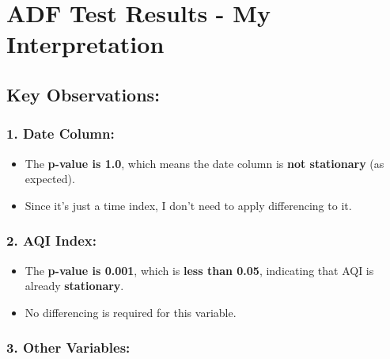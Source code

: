 \documentclass[11pt]{article}
\providecommand{\tightlist}{%
      \setlength{\itemsep}{0pt}\setlength{\parskip}{0pt}}
\begin{document}
    \hypertarget{adf-test-results---my-interpretation}{%
\section{\texorpdfstring{\textbf{ADF Test Results - My
Interpretation}}{ADF Test Results - My Interpretation}}\label{adf-test-results---my-interpretation}}

\hypertarget{key-observations}{%
\subsection{\texorpdfstring{\textbf{Key
Observations:}}{Key Observations:}}\label{key-observations}}

\hypertarget{date-column}{%
\subsubsection{\texorpdfstring{\textbf{1. Date
Column:}}{1. Date Column:}}\label{date-column}}

\begin{itemize}
\tightlist
\item
  The \textbf{p-value is 1.0}, which means the date column is
  \textbf{not stationary} (as expected).\\
\item
  Since it's just a time index, I don't need to apply differencing to
  it.
\end{itemize}

\hypertarget{aqi-index}{%
\subsubsection{\texorpdfstring{\textbf{2. AQI
Index:}}{2. AQI Index:}}\label{aqi-index}}

\begin{itemize}
\tightlist
\item
  The \textbf{p-value is 0.001}, which is \textbf{less than 0.05},
  indicating that AQI is already \textbf{stationary}.\\
\item
  No differencing is required for this variable.
\end{itemize}

\hypertarget{other-variables}{%
\subsubsection{\texorpdfstring{\textbf{3. Other
Variables:}}{3. Other Variables:}}\label{other-variables}}
\end{document}
